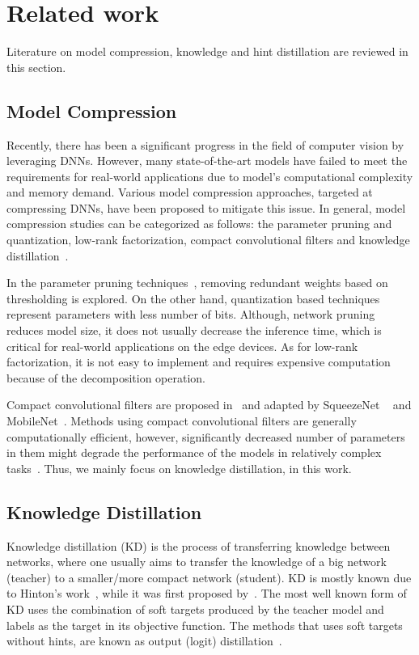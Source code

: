 \documentclass[final,3p,times]{elsarticle}
\begin{document}
\section{Related work}
\label{sec:related}

Literature on model compression, knowledge and hint distillation are reviewed in this section.  

\subsection{Model Compression}

Recently, there has been a significant progress in the field of computer vision by leveraging DNNs. However, many  state-of-the-art models have failed to meet the requirements for real-world applications due to model's computational complexity and memory demand. Various model compression approaches, targeted at compressing DNNs, have been proposed to mitigate this issue. In general, model compression studies can be categorized as follows: the parameter pruning and quantization, low-rank factorization, compact convolutional filters and knowledge distillation~\citep{cheng2017survey}. 

In the parameter pruning techniques~\citep{deepcompression2016iclr}, removing redundant weights based on thresholding is explored. On the other hand, quantization based techniques represent parameters with less number of bits. Although, network pruning reduces model size, it does not usually decrease the inference time, which is critical for real-world applications on the edge devices. As for low-rank factorization, it is not easy to implement and requires expensive computation because of the decomposition operation. 

Compact convolutional filters are proposed in~\citep{szegedy2017inception} and adapted by SqueezeNet ~\citep{iandola2016squeezenet} and MobileNet~\citep{sandler2018mobilenetv2}. Methods using compact convolutional filters are generally computationally efficient, however, significantly decreased number of parameters in them might degrade the performance of the models in relatively complex tasks~\citep{howard2019searching}. Thus, we mainly focus on knowledge distillation, in this work.

\subsection{Knowledge Distillation}

Knowledge distillation (KD) is the process of transferring knowledge between networks, where one usually aims to transfer the knowledge of a big network (teacher) to a smaller/more compact network (student). KD is mostly known due to Hinton's work~\citep{hinton2015distilling}, while it was first proposed by~\citep{bucilua2006model}. The most well known form of KD uses the combination of soft targets produced by the teacher model and labels as the target in its objective function. The methods that uses soft targets without hints, are known as output (logit) distillation~\citep{heo2019comprehensive}. 
\end{document}
